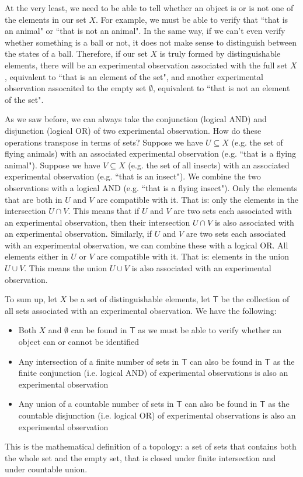 \documentclass[11pt,letterpaper,fleqn]{memoir} %
\begin{document}
At the very least, we need to be able to tell whether an object is or is not one of the elements in our set $X$. For example, we must be able to verify that ``that is an animal" or ``that is not an animal". In the same way, if we can't even verify whether something is a ball or not, it does not make sense to distinguish between the states of a ball. Therefore, if our set $X$ is truly formed by distinguishable elements, there will be an experimental observation associated with the full set $X$, equivalent to ``that is an element of the set", and another experimental observation assocaited to the empty set $\emptyset$, equivalent to ``that is not an element of the set".

As we saw before, we can always take the conjunction (logical AND) and disjunction (logical OR) of two experimental observation. How do these operations transpose in terms of sets? Suppose we have $U \subseteq X$ (e.g. the set of flying animals) with an associated experimental observation (e.g. ``that is a flying animal"). Suppose we have $V \subseteq X$ (e.g. the set of all insects) with an associated experimental observation (e.g. ``that is an insect"). We combine the two observations with a logical AND (e.g. ``that is a flying insect"). Only the elements that are both in $U$ and $V$ are compatible with it. That is: only the elements in the intersection $U \cap V$. This means that if $U$ and $V$ are two sets each associated with an experimental observation, then their intersection $U \cap V$ is also associated with an experimental observation. Similarly, if $U$ and $V$ are two sets each associated with an experimental observation, we can combine these with a logical OR. All elements either in $U$ or $V$ are compatible with it. That is: elements in the union $U \cup V$. This means the union $U \cup V$ is also associated with an experimental observation.

To sum up, let $X$ be a set of distinguishable elements, let $\mathsf{T}$ be the collection of all sets associated with an experimental observation. We have the following:
\begin{itemize}
	\item Both $X$ and $\emptyset$ can be found in $\mathsf{T}$ as we must be able to verify whether an object can or cannot be identified
	\item Any intersection of a finite number of sets in $\mathsf{T}$ can also be found in $\mathsf{T}$ as the finite conjunction (i.e. logical AND) of experimental observations is also an experimental observation
	\item Any union of a countable number of sets in $\mathsf{T}$ can also be found in $\mathsf{T}$ as the countable disjunction (i.e. logical OR) of experimental observations is also an experimental observation
\end{itemize}
This is the mathematical definition of a topology: a set of sets that contains both the whole set and the empty set, that is closed under finite intersection and under countable union.
\end{document}
